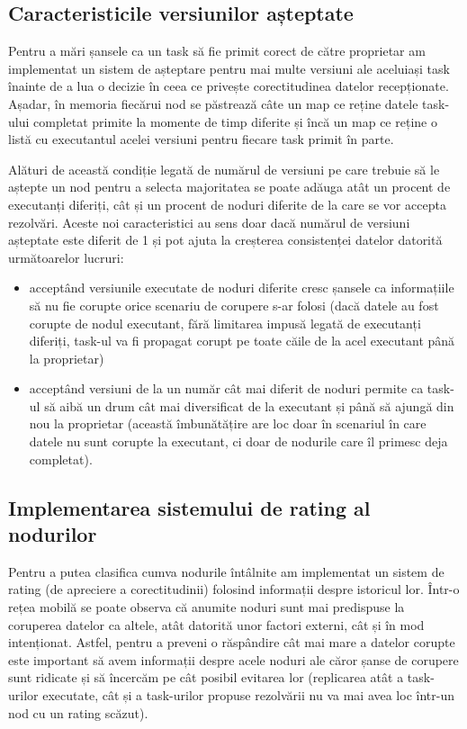 \documentclass[12pt,a4paper]{report}
\begin{document}
\subsection{Caracteristicile versiunilor așteptate} %

Pentru a mări șansele ca un task să fie primit corect de către proprietar am implementat un sistem de așteptare pentru mai multe versiuni ale aceluiași task înainte de a lua o decizie în ceea ce privește corectitudinea datelor recepționate. Așadar, în memoria fiecărui nod se păstrează câte un map ce reține datele task-ului completat primite la momente de timp diferite și încă un map ce reține o listă cu executantul acelei versiuni pentru fiecare task primit în parte. 

Alături de această condiție legată de numărul de versiuni pe care trebuie să le aștepte un nod pentru a selecta majoritatea se poate adăuga atât un procent de executanți diferiți, cât și un procent de noduri diferite de la care se vor accepta rezolvări. Aceste noi caracteristici au sens doar dacă numărul de versiuni așteptate este diferit de 1 și pot ajuta la creșterea consistenței datelor datorită următoarelor lucruri:
\begin{itemize}
	\item acceptând versiunile executate de noduri diferite cresc șansele ca informațiile să nu fie corupte orice scenariu de corupere s-ar folosi (dacă datele au fost corupte de nodul executant, fără limitarea impusă legată de executanți diferiți, task-ul va fi propagat corupt pe toate căile de la acel executant până la proprietar)
	\item acceptând versiuni de la un număr cât mai diferit de noduri permite ca task-ul să aibă un drum cât mai diversificat de la executant și până să ajungă din nou la proprietar (această îmbunătățire are loc doar în scenariul în care datele nu sunt corupte la executant, ci doar de nodurile care îl primesc deja completat).
\end{itemize}

\subsection{Implementarea sistemului de rating al nodurilor} \label{ratingSection}

Pentru a putea clasifica cumva nodurile întâlnite am implementat un sistem de rating (de apreciere a corectitudinii) folosind informații despre istoricul lor. Într-o rețea mobilă se poate observa că anumite noduri sunt mai predispuse la coruperea datelor ca altele, atât datorită unor factori externi, cât și în mod intenționat. Astfel, pentru a preveni o răspândire cât mai mare a datelor corupte este important să avem informații despre acele noduri ale căror șanse de corupere sunt ridicate și să încercăm pe cât posibil evitarea lor (replicarea atât a task-urilor executate, cât și a task-urilor propuse rezolvării nu va mai avea loc într-un nod cu un rating scăzut).
\end{document}
